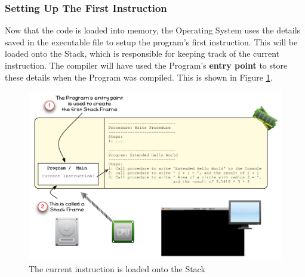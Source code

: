 \clearpage
\subsubsection{Setting Up The First Instruction} %
\label{ssub:setting_up_the_first_instruction}

Now that the code is loaded into memory, the Operating System uses the details saved in the executable file to setup the program's first instruction. This will be loaded onto the Stack, which is responsible for keeping track of the current instruction. The compiler will have used the Program's \textbf{entry point} to store these details when the Program was compiled. This is shown in Figure \ref{fig:program-creation-visualise-helloworld-3}.

\begin{figure}[htbp]
   \centering
   \includegraphics[width=\textwidth]{./topics/program-creation/images/ProgramExecution03} 
   \caption{The current instruction is loaded onto the Stack}
   \label{fig:program-creation-visualise-helloworld-3}
\end{figure}


